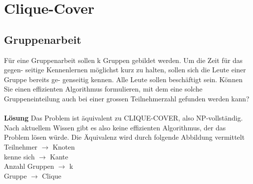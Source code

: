 \section{Clique-Cover}
\subsection{Gruppenarbeit}
Für eine Gruppenarbeit sollen k Gruppen gebildet werden. Um die Zeit für das gegen- seitige Kennenlernen möglichst kurz zu halten, sollen sich die Leute einer Gruppe bereits ge- genseitig kennen. Alle Leute sollen beschäftigt sein. Können Sie einen effizienten Algorithmus formulieren, mit dem eine solche Gruppeneinteilung auch bei einer grossen Teilnehmerzahl gefunden werden kann?\\
\\
\textbf{Lösung}
Das Problem ist äquivalent zu CLIQUE-COVER, also NP-vollständig. Nach aktuellem Wissen gibt es also keine effizienten Algorithmus, der das Problem lösen würde. Die Äquivalenz wird durch folgende Abbildung vermittelt\\
Teilnehmer $\rightarrow$ Knoten\\
kenne sich $\rightarrow$ Kante\\
Anzahl Gruppen $\rightarrow$ k\\
Gruppe $\rightarrow$ Clique\\

